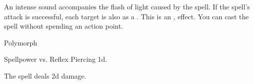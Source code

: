 An intense sound accompanies the flash of light caused by the spell.
If the spell's attack is successful, each target is also \deafened as a .
This is an ,  effect.
You can cast the spell without spending an action point.
\begin{spellsection}{Polymorph}
\begin{spellheader}
\end{spellheader}
\begin{spellcontent}
\begin{spelltargetinginfo}
\end{spelltargetinginfo}
\begin{spelleffects}
\begin{spellattack}{Spellpower vs. Reflex}
\spellsuccess Piercing  \plus1d.
\end{spellattack}
\end{spelleffects}
\end{spellcontent}
\begin{spellfooter}
\end{spellfooter}
\begin{spellsubcontent}
\begin{spellcantrip}
The spell deals \minus2d damage.
\end{spellcantrip}
\end{spellsubcontent}
\end{spellsection}
